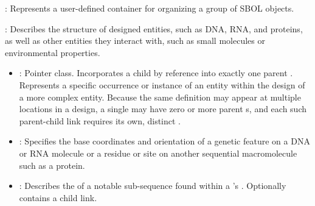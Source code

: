 \begin{description}

\item \emph{}:
Represents a user-defined container for organizing a group of SBOL objects.

\item \emph{}: Describes the structure of designed entities, such as DNA, RNA, and proteins, as well as other entities they interact with, such as small molecules or environmental properties.

\begin{itemize}
\item \emph{}:
Pointer class. Incorporates a child  by reference into exactly one parent . Represents a specific occurrence or instance of an entity within the design of a more complex entity. Because the same definition may appear at multiple locations in a design, a single  may have zero or more parent s, and each such parent-child link requires its own, distinct .

\item \emph{}:
Specifies the base coordinates and orientation of a genetic feature on a DNA or RNA molecule or a residue or site on another sequential macromolecule such as a protein.

\item \emph{}:
Describes the  of a notable sub-sequence found within a 
's . Optionally contains a child  link.


\end{itemize}
\end{description}
